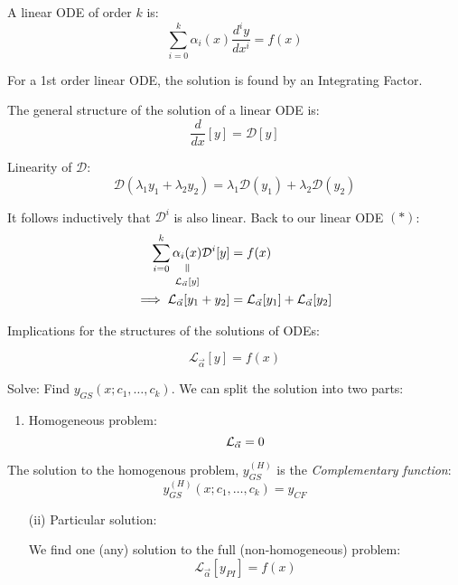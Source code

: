 \documentclass[10pt]{scrartcl}
\begin{document}


A linear ODE of order $k$ is:
\[\sum_{i=0}^k \alpha_i(x) \frac{d^iy}{dx^i} = f(x) \tag{$*$}\]

For a 1st order linear ODE, the solution is found by an Integrating Factor. 

The general structure of the solution of a linear ODE is: 
\[\frac{d}{dx}[y] = \mathcal{D}[y]\]

Linearity of $\mathcal{D}$:
\[\mathcal{D}(\lambda_1y_1 + \lambda_2y_2) = \lambda_1\mathcal{D}(y_1) +\lambda_2\mathcal{D}(y_2)\]

It follows inductively that $\mathcal{D}^i$ is also linear. Back to our linear ODE $(*)$: 
\[
\begin{aligned}
  \sum_{i=0}^k \equalto{\alpha_i(x)}{\mathcal{L}_{\vec{\alpha}}[y]}\mathcal{D}^i[y] &= f(x)\\
  \implies \mathcal{L}_{\vec{\alpha}}[y_1 + y_2] &= \mathcal{L}_{\vec{\alpha}}[y_1] + \mathcal{L}_{\vec{\alpha}}[y_2]
\end{aligned}
\]

Implications for the structures of the solutions of ODEs:

\[\mathcal{L}_{\vec{\alpha}}[y] = f(x)\]

Solve: Find $y_{GS}(x; c_1,\dots,c_k)$. We can split the solution into two parts: 

\begin{enumerate}
  \item Homogeneous problem: 
  \[\mathcal{L}_{\vec{\alpha}} = 0\vspace*{-5pt}\]
    \end{enumerate}\vspace*{5pt}
    
    \begin{definition}
  The solution to the homogenous problem, $y_{GS}^{(H)}$ is the \emph{Complementary function}: 	
    \[y_{GS}^{(H)}(x;c_1,\dots,c_k) = y_{CF}\]
  \end{definition}\vspace*{5pt}


\begin{enumerate}
  \item[(ii)] Particular solution: 
  
  We find one (any) solution to the full (non-homogeneous) problem:
    \[\mathcal{L}_{\vec{\alpha}}[y_{PI}] = f(x)\]
    
\end{enumerate}  
\end{document}
